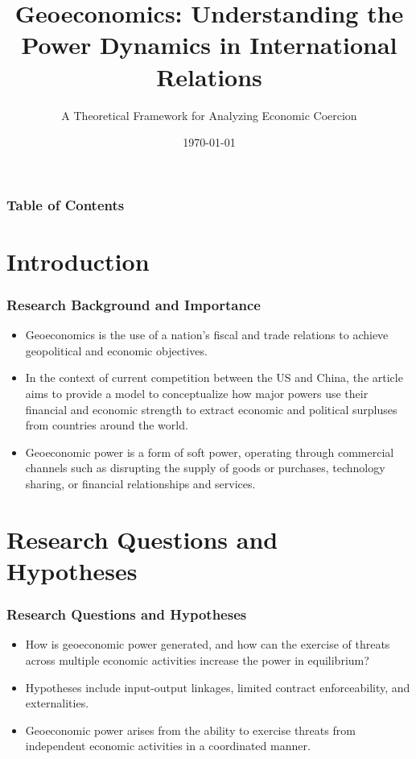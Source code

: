 \documentclass{beamer}
\title[Geoeconomics and Power]{Geoeconomics: Understanding the Power Dynamics in International Relations}
\subtitle{A Theoretical Framework for Analyzing Economic Coercion}
\institute[中央财经大学]{中国财政协同发展创新中心}
\date{\today}
\begin{document}
	
	\begin{frame}
		\titlepage
	\end{frame}
	
	\begin{frame}
		\frametitle{Table of Contents}
		\tableofcontents
	\end{frame}
	

\section{Introduction}

\begin{frame}
	\frametitle{Research Background and Importance}
	\begin{itemize}
		\item Geoeconomics is the use of a nation's fiscal and trade relations to achieve geopolitical and economic objectives.
		\item In the context of current competition between the US and China, the article aims to provide a model to conceptualize how major powers use their financial and economic strength to extract economic and political surpluses from countries around the world.
		\item Geoeconomic power is a form of soft power, operating through commercial channels such as disrupting the supply of goods or purchases, technology sharing, or financial relationships and services.
	\end{itemize}
\end{frame}

\section{Research Questions and Hypotheses}

\begin{frame}
	\frametitle{Research Questions and Hypotheses}
	\begin{itemize}
		\item How is geoeconomic power generated, and how can the exercise of threats across multiple economic activities increase the power in equilibrium?
		\item Hypotheses include input-output linkages, limited contract enforceability, and externalities.
		\item Geoeconomic power arises from the ability to exercise threats from independent economic activities in a coordinated manner.
	\end{itemize}
\end{frame}
\end{document}
